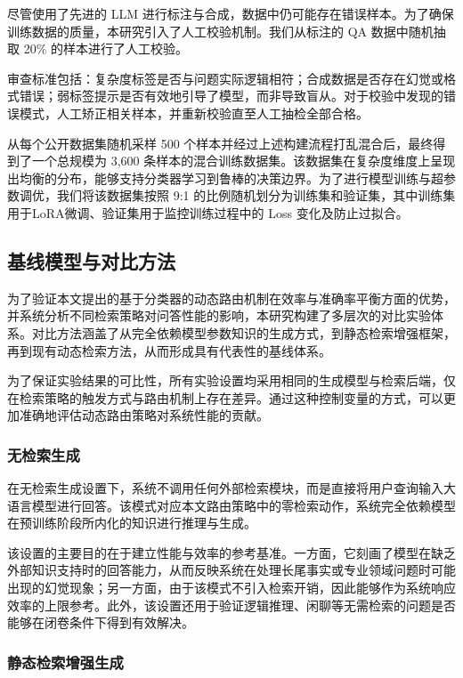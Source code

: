 尽管使用了先进的 LLM 进行标注与合成，数据中仍可能存在错误样本。为了确保训练数据的质量，本研究引入了人工校验机制。我们从标注的 QA 数据中随机抽取 20\% 的样本进行了人工校验。

审查标准包括：复杂度标签是否与问题实际逻辑相符；合成数据是否存在幻觉或格式错误；弱标签提示是否有效地引导了模型，而非导致盲从。对于校验中发现的错误模式，人工矫正相关样本，并重新校验直至人工抽检全部合格。

从每个公开数据集随机采样 500 个样本并经过上述构建流程打乱混合后，最终得到了一个总规模为 3,600 条样本的混合训练数据集。该数据集在复杂度维度上呈现出均衡的分布，能够支持分类器学习到鲁棒的决策边界。为了进行模型训练与超参数调优，我们将该数据集按照 9:1 的比例随机划分为训练集和验证集，其中训练集用于LoRA微调、验证集用于监控训练过程中的 Loss 变化及防止过拟合。


\subsection{基线模型与对比方法}
\label{sec:baselines}

为了验证本文提出的基于分类器的动态路由机制在效率与准确率平衡方面的优势，并系统分析不同检索策略对问答性能的影响，本研究构建了多层次的对比实验体系。对比方法涵盖了从完全依赖模型参数知识的生成方式，到静态检索增强框架，再到现有动态检索方法，从而形成具有代表性的基线体系。

为了保证实验结果的可比性，所有实验设置均采用相同的生成模型与检索后端，仅在检索策略的触发方式与路由机制上存在差异。通过这种控制变量的方式，可以更加准确地评估动态路由策略对系统性能的贡献。

\subsubsection{无检索生成}

在无检索生成设置下，系统不调用任何外部检索模块，而是直接将用户查询输入大语言模型进行回答。该模式对应本文路由策略中的零检索动作，系统完全依赖模型在预训练阶段所内化的知识进行推理与生成。

该设置的主要目的在于建立性能与效率的参考基准。一方面，它刻画了模型在缺乏外部知识支持时的回答能力，从而反映系统在处理长尾事实或专业领域问题时可能出现的幻觉现象；另一方面，由于该模式不引入检索开销，因此能够作为系统响应效率的上限参考。此外，该设置还用于验证逻辑推理、闲聊等无需检索的问题是否能够在闭卷条件下得到有效解决。

\subsubsection{静态检索增强生成}

